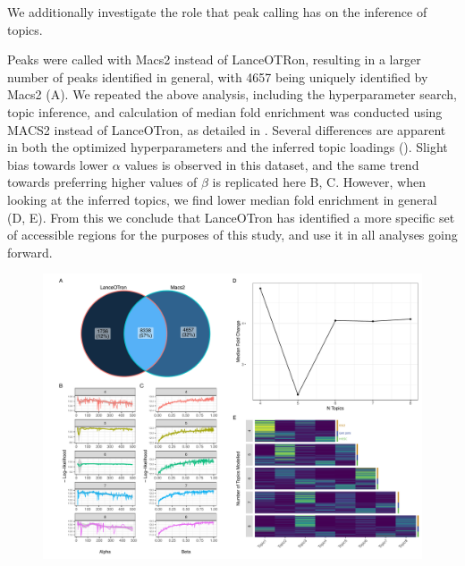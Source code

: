 We additionally investigate the role that peak calling has on the inference of topics. 

Peaks were called with Macs2 instead of LanceOTRon, resulting in a larger number of peaks identified in general, with 4657 being uniquely identified by Macs2 (A). We repeated the above analysis, including the hyperparameter search, topic inference, and calculation of median fold enrichment was conducted using MACS2 instead of LanceOTron, as detailed in . Several differences are apparent in both the optimized hyperparameters and the inferred topic loadings (). Slight bias towards lower $\alpha$ values is observed in this dataset, and the same trend towards preferring higher values of $\beta$ is replicated here B, C. However, when looking at the inferred topics, we find lower median fold enrichment in general (D, E). From this we conclude that LanceOTron has identified a more specific set of accessible regions for the purposes of this study, and use it in all analyses going forward. 

\begin{figure}
  \centering
  \includegraphics[width=\textwidth]{plot/ch4/sc_macs2.pdf}
  \label{fig:sc_macs2}
\end{figure}

